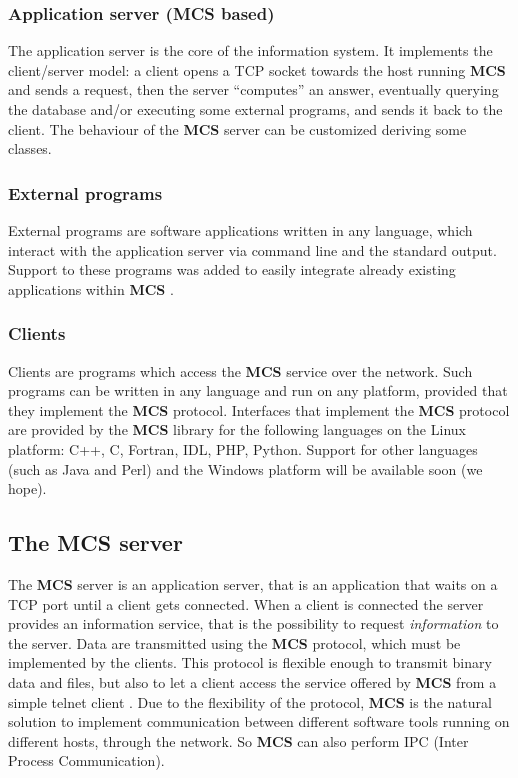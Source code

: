 \documentclass[12pt,titlepage]{article}
\newcommand{\mcs}{\textbf{MCS} }
\begin{document}
\subsubsection{Application server (\mcs based)}
The application server is the core of the information system. It
implements the client/server model: a client opens a TCP socket towards
the host running \mcs and sends a request, then the
server ``computes'' an answer, eventually querying the database and/or
executing some external programs, and sends it back to the client.
The behaviour of the \mcs server can be customized deriving some classes.

\subsubsection{External programs}
External programs are software applications written in any language, which
interact with the application server via command line and the standard output.
Support to these programs was added to easily integrate already
existing applications within \mcs.

%
\subsubsection{Clients}
Clients are programs which access the \mcs service over the
network. Such programs can be written in any language and run on any
platform, provided that they implement the \mcs protocol. Interfaces
that implement the \mcs protocol are provided by the \mcs library for
the following languages on the Linux platform: C++, C, Fortran, IDL,
PHP, Python. Support for other languages (such as Java and Perl) and
the Windows platform will be available soon (we hope).

%
\subsection{The \mcs server}
\label{sec:themcsserver}
The \mcs server is an application server, that is an application that waits on
a TCP port until a client gets connected. When a client is connected the
server provides an information service, that is the possibility to request
\emph{information} to the server. Data are transmitted using the \mcs
protocol, which must be implemented by the clients. This protocol is flexible
enough to transmit binary data and files, but also to let a client access the
service offered by \mcs from a simple telnet client . Due to the flexibility
of the protocol, \mcs is the natural solution to implement communication
between different software tools running on different hosts, through the
network. So \mcs can also perform IPC (Inter Process Communication).
\end{document}
